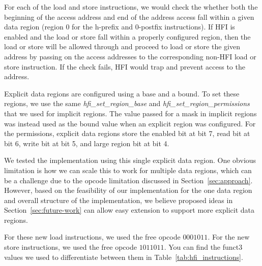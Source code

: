 \documentclass[conference,compsoc]{IEEEtran}
\begin{document}
For each of the load and store instructions, we would check the whether both the beginning of the access address and end of the address access fall within a given data region (region 0 for the h-prefix and 0-postfix instructions). If HFI is enabled and the load or store fall within a properly configured region, then the load or store will be allowed through and proceed to load or store the given address by passing on the access addresses to the corresponding non-HFI load or store instruction. If the check fails, HFI would trap and prevent access to the address.

Explicit data regions are configured using a base and a bound. To set these regions, we use the same \textit{hfi\_set\_region\_base} and \textit{hfi\_set\_region\_permissions} that we used for implicit regions. The value passed for a mask in implicit regions was instead used as the bound value when an explicit region was configured. For the permissions, explicit data regions store the enabled bit at bit 7, read bit at bit 6, write bit at bit 5, and large region bit at bit 4.

We tested the implementation using this single explicit data region. One obvious limitation is how we can scale this to work for multiple data regions, which can be a challenge due to the opcode limitation discussed in Section~\ref{sec:approach}. However, based on the feasibility of our implementation for the one data region and overall structure of the implementation, we believe proposed ideas in Section~\ref{sec:future-work} can allow easy extension to support more explicit data regions.

For these new load instructions, we used the free opcode $0001011$. For the new store instructions, we used the free opcode $1011011$. You can find the funct3 values we used to differentiate between them in Table~\ref{tab:hfi_instructions}.
\end{document}
